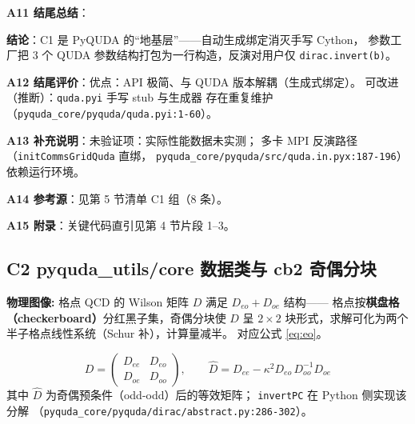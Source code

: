\documentclass[UTF8]{ctexart}
\begin{document}
\textbf{A11 结尾总结}：
\begin{conclbox}
\textbf{结论}：C1 是 PyQUDA 的“地基层”——自动生成绑定消灭手写 Cython，
参数工厂把 3 个 QUDA 参数结构打包为一行构造，反演对用户仅 \texttt{dirac.invert(b)}。
\end{conclbox}

\textbf{A12 结尾评价}：优点：API 极简、与 QUDA 版本解耦（生成式绑定）。
可改进（\textcolor{phys}{推断}）：\texttt{quda.pyi} 手写 stub 与生成器
存在重复维护（\texttt{\nolinkurl{pyquda_core/pyquda/quda.pyi:1-60}}）。

\textbf{A13 补充说明}：\textcolor{warn}{未验证}项：实际性能数据未实测；
多卡 MPI 反演路径（\texttt{initCommsGridQuda} 直绑，
\texttt{\nolinkurl{pyquda_core/pyquda/src/quda.in.pyx:187-196}}）依赖运行环境。

\textbf{A14 参考源}：见第 5 节清单 C1 组（8 条）。

\textbf{A15 附录}：关键代码直引见第 4 节片段 1–3。

\subsection{C2 pyquda\_utils/core 数据类与 cb2 奇偶分块}

\begin{physbox}
\textbf{物理图像:} 格点 QCD 的 Wilson 矩阵 $D$ 满足 $D_{eo}+D_{oe}$ 结构——
格点按\textbf{棋盘格（checkerboard）}分红黑子集，奇偶分块使 $D$ 呈
$2\times2$ 块形式，求解可化为两个半子格点线性系统（Schur 补），计算量减半。
对应公式 \eqref{eq:eo}。
\end{physbox}
\begin{equation}\label{eq:eo}
D = \begin{pmatrix} D_{ee} & D_{eo} \\ D_{oe} & D_{oo} \end{pmatrix},\qquad
\hat{D} = D_{ee} - \kappa^2 D_{eo}\,D_{oo}^{-1}D_{oe}
\end{equation}
其中 $\hat{D}$ 为奇偶预条件（odd-odd）后的等效矩阵；
\texttt{invertPC} 在 Python 侧实现该分解
（\texttt{\nolinkurl{pyquda_core/pyquda/dirac/abstract.py:286-302}}）。
\end{document}
